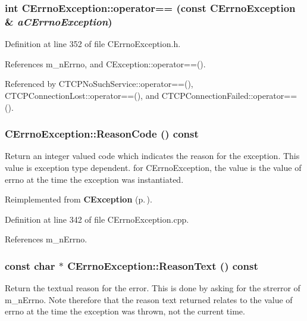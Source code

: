 \subsubsection{\setlength{\rightskip}{0pt plus 5cm}int CErrno\-Exception::operator== (const CErrno\-Exception \& {\em a\-CErrno\-Exception})\hspace{0.3cm}{\tt  [inline]}}\label{classCErrnoException_a5}




Definition at line 352 of file CErrno\-Exception.h.

References m\_\-n\-Errno, and CException::operator==().

Referenced by CTCPNo\-Such\-Service::operator==(), CTCPConnection\-Lost::operator==(), and CTCPConnection\-Failed::operator==().
\subsubsection{ CErrno\-Exception::Reason\-Code () const\hspace{0.3cm}{\tt  [virtual]}}\label{classCErrnoException_a8}


Return an integer valued code which indicates the reason for the exception. This value is exception type dependent. for CErrno\-Exception, the value is the value of errno at the time the exception was instantiated. 

Reimplemented from {\bf CException} {\rm (p.\,\pageref{classCException_a9})}.

Definition at line 342 of file CErrno\-Exception.cpp.

References m\_\-n\-Errno.
\subsubsection{\setlength{\rightskip}{0pt plus 5cm}const char $\ast$ CErrno\-Exception::Reason\-Text () const\hspace{0.3cm}{\tt  [virtual]}}\label{classCErrnoException_a7}


Return the textual reason for the error. This is done by asking for the strerror of m\_\-n\-Errno. Note therefore that the reason text returned relates to the value of errno at the time the exception was thrown, not the current time. 

